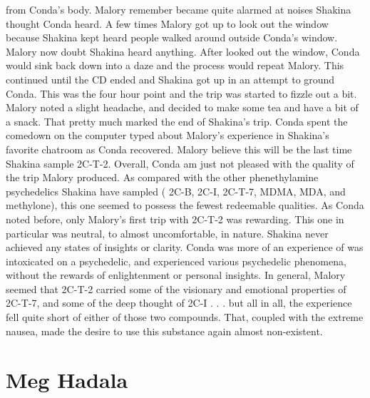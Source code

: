 \documentclass[12pt]{book}
\begin{document}
from Conda's body. Malory remember became quite alarmed at noises Shakina thought Conda heard. A few times Malory got up to look out the window because Shakina kept heard people walked around outside Conda's window. Malory now doubt Shakina heard anything. After looked out the window, Conda would sink back down into a daze and the process would repeat Malory. This continued until the CD ended and Shakina got up in an attempt to ground Conda. This was the four hour point and the trip was started to fizzle out a bit. Malory noted a slight headache, and decided to make some tea and have a bit of a snack. That pretty much marked the end of Shakina's trip. Conda spent the comedown on the computer typed about Malory's experience in Shakina's favorite chatroom as Conda recovered. Malory believe this will be the last time Shakina sample 2C-T-2. Overall, Conda am just not pleased with the quality of the trip Malory produced. As compared with the other phenethylamine psychedelics Shakina have sampled ( 2C-B, 2C-I, 2C-T-7, MDMA, MDA, and methylone), this one seemed to possess the fewest redeemable qualities. As Conda noted before, only Malory's first trip with 2C-T-2 was rewarding. This one in particular was neutral, to almost uncomfortable, in nature. Shakina never achieved any states of insights or clarity. Conda was more of an experience of was intoxicated on a psychedelic, and experienced various psychedelic phenomena, without the rewards of enlightenment or personal insights. In general, Malory seemed that 2C-T-2 carried some of the visionary and emotional properties of 2C-T-7, and some of the deep thought of 2C-I . . . but all in all, the experience fell quite short of either of those two compounds. That, coupled with the extreme nausea, made the desire to use this substance again almost non-existent.



\chapter{Meg Hadala}
\end{document}
